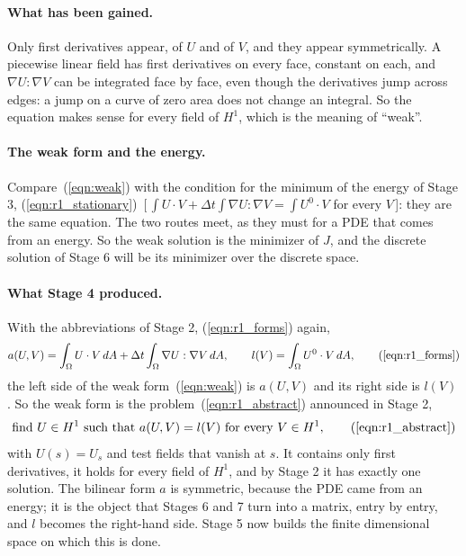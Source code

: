 \paragraph{What has been gained.} Only first derivatives appear, of $U$ and of $V$, and they appear symmetrically. A piecewise linear field has first derivatives on every face, constant on each, and $\nabla U : \nabla V$ can be integrated face by face, even though the derivatives jump across edges: a jump on a curve of zero area does not change an integral. So the equation makes sense for every field of $H^1$, which is the meaning of ``weak''.

\paragraph{The weak form and the energy.} Compare~(\ref{eqn:weak}) with the condition for the minimum of the energy of Stage 3, (\ref{eqn:r1_stationary})~[\,$\int U\cdot V + \Delta t\int\nabla U:\nabla V = \int U^0\cdot V$ for every $V$\,]: they are the same equation. The two routes meet, as they must for a PDE that comes from an energy. So the weak solution is the minimizer of $J$, and the discrete solution of Stage 6 will be its minimizer over the discrete space.

\paragraph{What Stage 4 produced.} With the abbreviations of Stage 2, (\ref{eqn:r1_forms}) again,
\begin{equation*}
a(U, V) = \int_\Omega U\cdot V\, dA + \Delta t \int_\Omega \nabla U : \nabla V\, dA, \qquad l(V) = \int_\Omega U^0\cdot V\, dA , \tag{\ref{eqn:r1_forms}}
\end{equation*}
the left side of the weak form~(\ref{eqn:weak}) is $a(U, V)$ and its right side is $l(V)$. So the weak form is the problem~(\ref{eqn:r1_abstract}) announced in Stage 2,
\begin{equation*}
\text{find } U \in H^1 \text{ such that } a(U, V) = l(V) \text{ for every } V \in H^1 , \tag{\ref{eqn:r1_abstract}}
\end{equation*}
with $U(s) = U_s$ and test fields that vanish at $s$. It contains only first derivatives, it holds for every field of $H^1$, and by Stage 2 it has exactly one solution. The bilinear form $a$ is symmetric, because the PDE came from an energy; it is the object that Stages 6 and 7 turn into a matrix, entry by entry, and $l$ becomes the right-hand side. Stage 5 now builds the finite dimensional space on which this is done.

